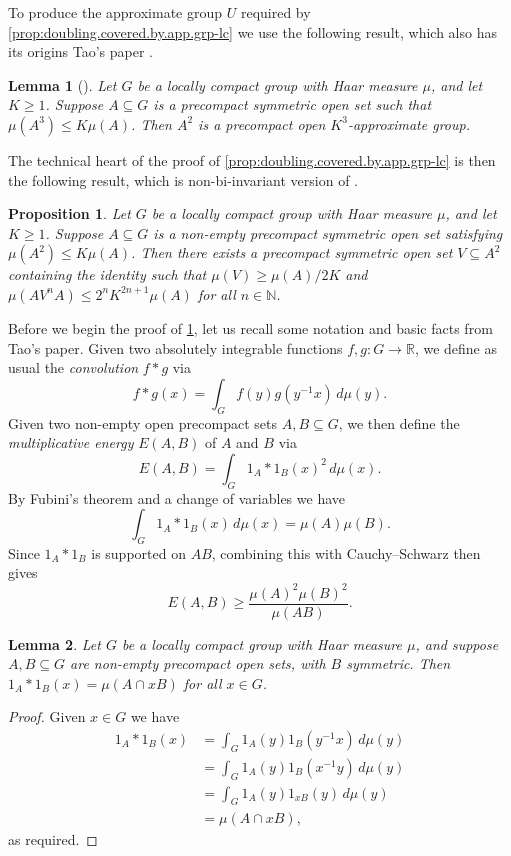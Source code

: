 \documentclass[10pt]{article}
\newcommand{\N}{\mathbb{N}}
\newcommand{\R}{\mathbb{R}}
\newtheorem{prop}{Proposition}[section]
\newtheorem{lemma}[lemma]{Lemma}
\begin{document}
To produce the approximate group $U$ required by \cref{prop:doubling.covered.by.app.grp-lc} we use the following result, which also has its origins Tao's paper \cite{tao.product.set}.
\begin{lemma}[{\cite[Proposition 6.1]{ttTrof}}]\label{lem:tripling->AG}
Let $G$ be a locally compact group with Haar measure $\mu$, and let $K\ge1$. Suppose $A\subseteq G$ is a precompact symmetric open set such that $\mu(A^3)\le K\mu(A)$. Then $A^2$ is a precompact open $K^3$-approximate group.
\end{lemma}
The technical heart of the proof of \cref{prop:doubling.covered.by.app.grp-lc} is then the following result, which is non-bi-invariant version of \cite[Proposition 4.5]{tao.product.set}.
\begin{prop}\label{prop:tao.4.5}
Let $G$ be a locally compact group with Haar measure $\mu$, and let $K\ge1$. Suppose $A\subseteq G$ is a non-empty precompact symmetric open set satisfying $\mu(A^2)\le K\mu(A)$. Then there exists a precompact symmetric open set $V\subseteq A^2$ containing the identity such that $\mu(V)\ge\mu(A)/2K$ and $\mu(AV^nA)\le2^nK^{2n+1}\mu(A)$ for all $n\in\N$.
\end{prop}
Before we begin the proof of \cref{prop:tao.4.5}, let us recall some notation and basic facts from Tao's paper. Given two absolutely integrable functions $f,g:G\to\R$, we define as usual the \emph{convolution} $f\ast g$ via
\[
f\ast g(x)=\int_Gf(y)g(y^{-1}x)\,d\mu(y).
\]
Given two non-empty open precompact sets $A,B\subseteq G$, we then define the \emph{multiplicative energy} $E(A,B)$ of $A$ and $B$ via
\[
E(A,B)=\int_G1_A\ast1_B(x)^2\,d\mu(x).
\]
By Fubini's theorem and a change of variables we have
\begin{equation}\label{eq:tao6}
\int_G1_A\ast1_B(x)\,d\mu(x)=\mu(A)\mu(B).
\end{equation}
Since $1_A\ast1_B$ is supported on $AB$, combining this with Cauchy--Schwarz then gives
\begin{equation}\label{eq:tao9}
E(A,B)\ge\frac{\mu(A)^2\mu(B)^2}{\mu(AB)}.
\end{equation}
\begin{lemma}\label{lem:1A*1B}
Let $G$ be a locally compact group with Haar measure $\mu$, and suppose $A,B\subseteq G$ are non-empty precompact open sets, with $B$ symmetric. Then $1_A\ast1_B(x)=\mu(A\cap xB)$ for all $x\in G$.
\end{lemma}
\begin{proof}
Given $x\in G$ we have
\begin{align*}
1_A\ast1_B(x)&=\int_G1_A(y)1_B(y^{-1}x)\,d\mu(y)\\
		&=\int_G1_A(y)1_B(x^{-1}y)\,d\mu(y)\\
		&=\int_G1_A(y)1_{xB}(y)\,d\mu(y)\\
		&=\mu(A\cap xB),
\end{align*}
as required.
\end{proof}
\end{document}
